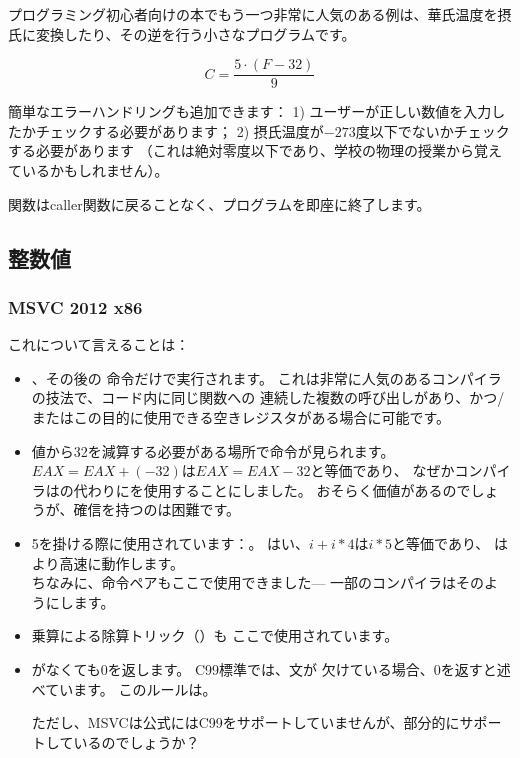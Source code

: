 
プログラミング初心者向けの本でもう一つ非常に人気のある例は、華氏温度を摂氏に変換したり、その逆を行う小さなプログラムです。

\[
	C=\frac{5 \cdot (F-32)}{9}
\]

簡単なエラーハンドリングも追加できます：
1) ユーザーが正しい数値を入力したかチェックする必要があります；
2) 摂氏温度が$-273$度以下でないかチェックする必要があります
（これは絶対零度以下であり、学校の物理の授業から覚えているかもしれません）。

関数は\gls{caller}関数に戻ることなく、プログラムを即座に終了します。

\subsection{整数値}



\subsubsection{\Optimizing MSVC 2012 x86}



これについて言えることは：

\begin{itemize}
\item {}、その後の
命令だけで実行されます。
これは非常に人気のあるコンパイラの技法で、コード内に同じ関数への
連続した複数の呼び出しがあり、かつ/またはこの目的に使用できる空きレジスタがある場合に可能です。

\item 値から32を減算する必要がある場所で命令が見られます。
$EAX=EAX+(-32)$は$EAX=EAX-32$と等価であり、
なぜかコンパイラはの代わりにを使用することにしました。
おそらく価値があるのでしょうが、確信を持つのは困難です。

\item {}5を掛ける際に使用されています：。
はい、$i+i*4$は$i*5$と等価であり、\LEA
はより高速に動作します。\\
ちなみに、命令ペアもここで使用できました---
一部のコンパイラはそのようにします。

\item 乗算による除算トリック（）も
ここで使用されています。

\item {}がなくても0を返します。
C99標準では、文が
欠けている場合、0を返すと述べています。
このルールは。

ただし、MSVCは公式にはC99をサポートしていませんが、部分的にサポートしているのでしょうか？
\end{itemize}

